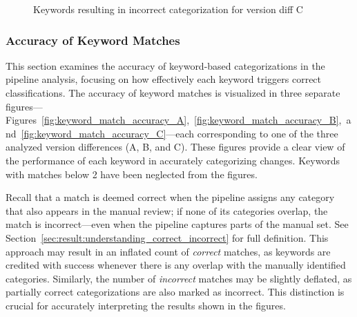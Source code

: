 \begin{figure}[H]
    \centering
    \caption{Keywords resulting in incorrect categorization for version diff C}
    \label{fig:keyword_incorrect_trigger_C}
\end{figure}




\subsubsection{Accuracy of Keyword Matches}
\label{sec:result:keyword_distribution:Accuracy_of_keyword_matches}

This section examines the accuracy of keyword-based categorizations in the pipeline analysis, focusing on how effectively each keyword triggers correct classifications. The accuracy of keyword matches is visualized in three separate figures—Figures~\ref{fig:keyword_match_accuracy_A},~\ref{fig:keyword_match_accuracy_B},~and~\ref{fig:keyword_match_accuracy_C}—each corresponding to one of the three analyzed version differences (A, B, and C). These figures provide a clear view of the performance of each keyword in accurately categorizing changes. Keywords with matches below 2 have been
neglected from the figures.

Recall that a match is deemed correct when the pipeline assigns any category that also appears in the manual review; if none of its categories overlap, the match is incorrect—even when the pipeline captures parts of the manual set. See Section~\ref{sec:result:understanding_correct_incorrect} for full definition. This approach may result in an inflated count of \textit{correct} matches, as keywords are credited with success whenever there is any overlap with the manually identified categories. Similarly, the number of \textit{incorrect} matches may be slightly deflated, as partially correct categorizations are also marked as incorrect. This distinction is crucial for accurately interpreting the results shown in the figures.



